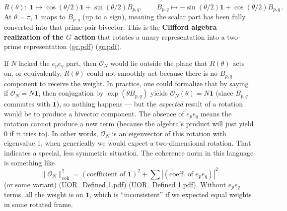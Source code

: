 \documentclass[12pt]{article}
\begin{document}
\[
R(\theta):\; \mathbf{1} \mapsto \cos(\theta/2)\mathbf{1} + \sin(\theta/2) B_{p,q}, \qquad 
B_{p,q} \mapsto -\sin(\theta/2)\mathbf{1} + \cos(\theta/2) B_{p,q}\,.
\]
At $\theta=\pi$, $\mathbf{1}$ maps to $B_{p,q}$ (up to a sign), meaning the scalar part has been fully converted into that prime-pair bivector. This is the \textbf{Clifford algebra realization of the $G$ action} that rotates a unary representation into a two-prime representation (\href{file://file-7ZYYwSHWVa83XEVTrEhg5z#:~:text=The%20Clifford%20algebra%20provides%20a,Because%20the%20Clifford%20algebra}{gc.pdf}) (\href{file://file-7ZYYwSHWVa83XEVTrEhg5z#:~:text=bivectors%29%20in%20one%20algebraic%20object,Lie%20group%20inside%20the%20Clifford}{gc.pdf}).

If $N$ lacked the $e_p e_q$ part, then $\mathcal{O}_N$ would lie outside the plane that $R(\theta)$ acts on, or equivalently, $R(\theta)$ could not smoothly act because there is no $B_{p,q}$ component to receive the weight. In practice, one could formalize that by saying if $\mathcal{O}_N = N\mathbf{1}$, then conjugation by $\exp(\theta B_{p,q})$ yields $\mathcal{O}_N(\theta) = N\mathbf{1}$ (since $B_{p,q}$ commutes with $\mathbf{1}$), so nothing happens --- but the \emph{expected} result of a rotation would be to produce a bivector component. The absence of $e_p e_q$ means the rotation cannot produce a new term (because the algebra’s product will just yield 0 if it tries to). In other words, $\mathcal{O}_N$ is an eigenvector of this rotation with eigenvalue 1, when generically we would expect a two-dimensional rotation. That indicates a special, less symmetric situation. The coherence norm in this language is something like
\[
\|\mathcal{O}_N\|_{\text{coh}}^2 = (\text{coefficient of }\mathbf{1})^2 + \sum \left|(\text{coeff. of }e_p e_q)\right|^2
\]
(or some variant) (\href{file://file-Rasc2uW2LQtFGLmNLDMJzD#:~:text=products%20of%20matching%20grade%20elements%29,magnitude%20of%20an%20object%20reference}{UOR\_Defined 1.pdf}) (\href{file://file-Rasc2uW2LQtFGLmNLDMJzD#:~:text=match%20at%20L393%20%24,mixing%20basis%20blades}{UOR\_Defined 1.pdf}). Without $e_p e_q$ terms, all the weight is on $\mathbf{1}$, which is ``inconsistent'' if we expected equal weights in some rotated frame.
\end{document}
